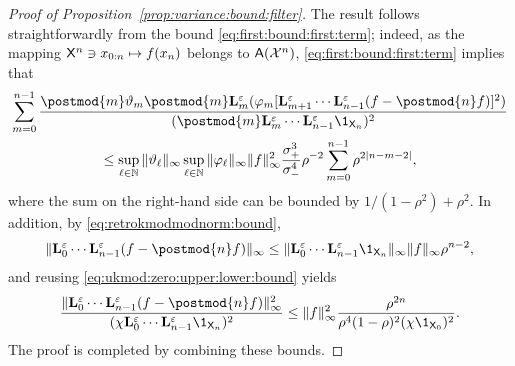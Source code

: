 \begin{proof}[Proof of Proposition~\ref{prop:variance:bound:filter}]
The result follows straightforwardly from the bound \eqref{eq:first:bound:first:term}; indeed, as the mapping $\mathsf{X}^n \ni x_{0:n} \mapsto f(x_n)$ belongs to $\mathsf{A}(\mathcal{X}^n)$, \eqref{eq:first:bound:first:term} implies that 
\begin{multline*}
\sum_{m = 0}^{n - 1} \frac{\postmod{m} \adjfuncforward{m} \postmod{m} \ukmod{m}(\varphi_m [\ukmod{m + 1} \cdots \ukmod{n - 1} (f - \postmod{n} f)
]^2)}{(\postmod{m} \ukmod{m} \cdots \ukmod{n - 1} \1_{\Xset_n})^2} \\ 
\leq \sup_{\ell \in \nset} \| \adjfuncforward{\ell} \|_\infty \sup_{\ell \in \nset} \| \varphi_\ell \|_\infty \|f \|_\infty^2 \frac{\udup^3}{\udlow^4} \rho^{-2}
\sum_{m = 0}^{n - 1} \rho^{2 |n - m - 2|},  
\end{multline*}
where the sum on the right-hand side can be bounded by $1 / (1 - \rho^2) + \rho^2$. In addition, by \eqref{eq:retrokmodmodnorm:bound}, 
$$
\| \ukmod{0} \cdots \ukmod{n - 1} (f - \postmod{n} f) \|_\infty \leq \| \ukmod{0} \cdots \ukmod{n - 1} \1_{\Xset_n} \|_\infty \|f \|_\infty \rho^{n - 2}, 
$$
and reusing \eqref{eq:ukmod:zero:upper:lower:bound} yields 
$$
\frac{\| \ukmod{0} \cdots \ukmod{n - 1} (f - \postmod{n} f) \|_\infty^2}{(\chi \ukmod{0} \cdots \ukmod{n - 1} \1_{\Xset_n})^2} \leq \| f \|_\infty^2 \frac{\rho^{2n}}{\rho^4(1 - \rho)^2 (\chi \1_{\Xset_0})^2}. 
$$
The proof is completed by combining these bounds. 
\end{proof}
